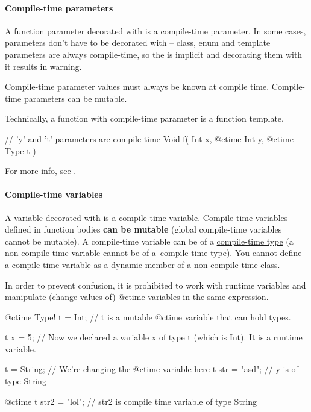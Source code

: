 \paragraph{Compile-time parameters}
A function parameter decorated with  is a compile-time parameter. In some cases, parameters don't have to be decorated with  -- class, enum and template parameters are always compile-time, so the  is implicit and decorating them with it results in warning.

Compile-time parameter values must always be known at compile time. Compile-time parameters can be mutable.

Technically, a function with compile-time parameter is a function template.

\begin{code}
// 'y' and 't' parameters are compile-time
Void f( Int x, @ctime Int y, @ctime Type t ) {
	
}
\end{code}

For more info, see .

\paragraph{Compile-time variables}
A variable decorated with  is a compile-time variable. Compile-time variables defined in function bodies \textbf{can be mutable} (global compile-time variables cannot be mutable). A compile-time variable can be of a \hyperref[ctime:class]{compile-time type} (a non-compile-time variable cannot be of a~compile-time type). You cannot define a compile-time variable as a dynamic member of a non-compile-time class.

In order to prevent confusion, it is prohibited to work with runtime variables and manipulate (change values of) @ctime variables in the same expression.

\begin{code}
@ctime Type! t = Int; // t is a mutable @ctime variable that can hold types.

t x = 5; // Now we declared a variable x of type t (which is Int). It is a runtime variable.

t = String; // We're changing the @ctime variable here
t str = "asd"; // y is of type String

@ctime t str2 = "lol"; // str2 is compile time variable of type String
\end{code}

